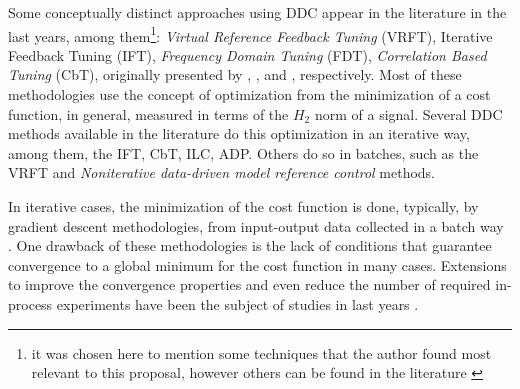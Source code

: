 
Some conceptually distinct approaches using DDC appear in the literature in the last years, among them\footnote{it was chosen here to mention some techniques that the author found most relevant to this proposal, however others can be found in the literature \citep{sadegh1998, safonov1995, karimi2007, huang2008, schaal1994, shi2000}}:
\emph{Virtual Reference Feedback Tuning} (VRFT), Iterative Feedback Tuning (IFT), \emph{Frequency Domain Tuning} (FDT), \emph{Correlation Based Tuning} (CbT), originally presented by \cite{campi2002}, \cite{hjalmarsson1994}, \cite{kammer2000} and \cite{karimi2002}, respectively.
Most of these methodologies use the concept of optimization from the minimization of a cost function, in general, measured in terms of the $H_2$ norm of a signal. 
Several DDC methods available in the literature do this optimization in an iterative way, among them, the IFT, CbT, ILC, ADP. 
Others do so in batches, such as the VRFT and \textit{Noniterative data-driven model reference control} methods.  

In iterative cases, the minimization of the cost function is done, typically, by gradient descent methodologies, from input-output data collected in a batch way \citep{bazanella2008a}.
One drawback of these methodologies is the lack of conditions that guarantee convergence to a global minimum for the cost function in many cases.
Extensions to improve the convergence properties and even reduce the number of required in-process experiments have been the subject of studies in last years \citep{huusom2009}.

